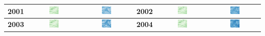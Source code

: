 \begin{longtable}{|c|c|c|c|c|c|}
    \textbf{2001} & \includegraphics[width=0.2\textwidth]{img_sat/NDVI_2001.png} & \includegraphics[width=0.2\textwidth]{img_sat/NSI_2001.png} &
    \textbf{2002} & \includegraphics[width=0.2\textwidth]{img_sat/NDVI_2002.png} & \includegraphics[width=0.2\textwidth]{img_sat/NSI_2002.png} \\
    \hline
    

    \textbf{2003} & \includegraphics[width=0.2\textwidth]{img_sat/NDVI_2003.png} & \includegraphics[width=0.2\textwidth]{img_sat/NSI_2003.png} &
    \textbf{2004} & \includegraphics[width=0.2\textwidth]{img_sat/NDVI_2004.png} & \includegraphics[width=0.2\textwidth]{img_sat/NSI_2004.png} \\
    \hline
    


\end{longtable}
